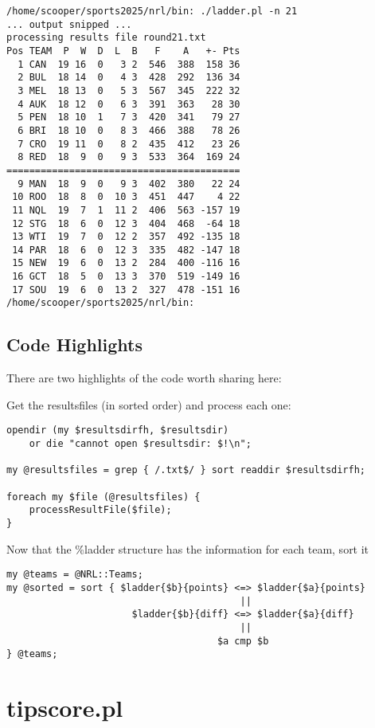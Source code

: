 \documentclass{article}
\begin{document}
\begin{verbatim}
/home/scooper/sports2025/nrl/bin: ./ladder.pl -n 21
... output snipped ...
processing results file round21.txt
Pos TEAM  P  W  D  L  B   F    A   +- Pts
  1 CAN  19 16  0   3 2  546  388  158 36
  2 BUL  18 14  0   4 3  428  292  136 34
  3 MEL  18 13  0   5 3  567  345  222 32
  4 AUK  18 12  0   6 3  391  363   28 30
  5 PEN  18 10  1   7 3  420  341   79 27
  6 BRI  18 10  0   8 3  466  388   78 26
  7 CRO  19 11  0   8 2  435  412   23 26
  8 RED  18  9  0   9 3  533  364  169 24
=========================================
  9 MAN  18  9  0   9 3  402  380   22 24
 10 ROO  18  8  0  10 3  451  447    4 22
 11 NQL  19  7  1  11 2  406  563 -157 19
 12 STG  18  6  0  12 3  404  468  -64 18
 13 WTI  19  7  0  12 2  357  492 -135 18
 14 PAR  18  6  0  12 3  335  482 -147 18
 15 NEW  19  6  0  13 2  284  400 -116 16
 16 GCT  18  5  0  13 3  370  519 -149 16
 17 SOU  19  6  0  13 2  327  478 -151 16
/home/scooper/sports2025/nrl/bin:
\end{verbatim}

\subsection{Code Highlights}

There are two highlights of the code worth sharing here:

Get the resultsfiles (in sorted order) and process each one:
\begin{verbatim}
opendir (my $resultsdirfh, $resultsdir)
    or die "cannot open $resultsdir: $!\n";

my @resultsfiles = grep { /.txt$/ } sort readdir $resultsdirfh;

foreach my $file (@resultsfiles) {
    processResultFile($file);
}

\end{verbatim}

Now that the \%ladder structure has the information for each team,
sort it

\begin{verbatim}
my @teams = @NRL::Teams;
my @sorted = sort { $ladder{$b}{points} <=> $ladder{$a}{points}
                                         ||
                      $ladder{$b}{diff} <=> $ladder{$a}{diff}
                                         ||
                                     $a cmp $b
} @teams;
\end{verbatim}

\section{tipscore.pl}
\end{document}
